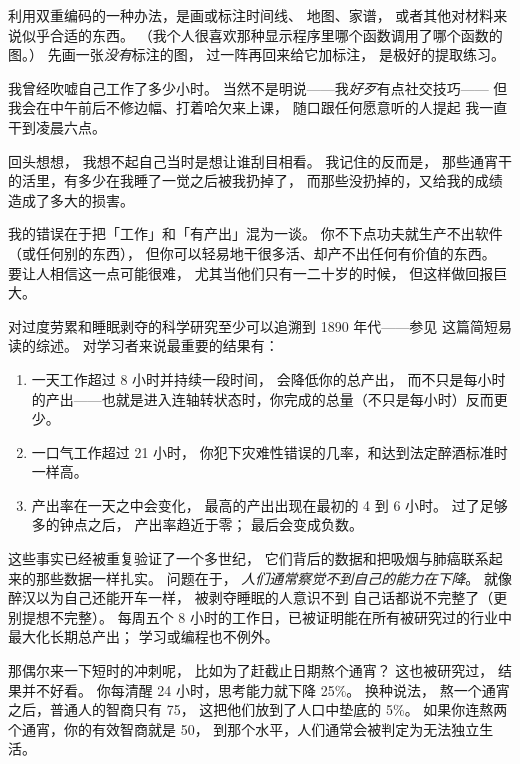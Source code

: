 利用双重编码的一种办法，是画或标注时间线、
地图、家谱，
或者其他对材料来说似乎合适的东西。
（我个人很喜欢那种显示程序里哪个函数调用了哪个函数的图。）
先画一张\emph{没有}标注的图，
过一阵再回来给它加标注，
是极好的提取练习。


我曾经吹嘘自己工作了多少小时。
当然不是明说——我\emph{好歹}有点社交技巧——
但我会在中午前后不修边幅、打着哈欠来上课，
随口跟任何愿意听的人提起
我一直干到凌晨六点。

回头想想，
我想不起自己当时是想让谁刮目相看。
我记住的反而是，
那些通宵干的活里，有多少在我睡了一觉之后被我扔掉了，
而那些没扔掉的，又给我的成绩造成了多大的损害。

我的错误在于把「工作」和「有产出」混为一谈。
你不下点功夫就生产不出软件（或任何别的东西），
但你可以轻易地干很多活、却产不出任何有价值的东西。
要让人相信这一点可能很难，
尤其当他们只有一二十岁的时候，
但这样做回报巨大。

对过度劳累和睡眠剥夺的科学研究至少可以追溯到 1890 年代——参见
\cite{Robi2005}这篇简短易读的综述。
对学习者来说最重要的结果有：

\begin{enumerate}

\item
  一天工作超过 8 小时并持续一段时间，
  会降低你的总产出，
  而不只是每小时的产出——也就是进入连轴转状态时，你完成的总量（不只是每小时）反而更少。

\item
  一口气工作超过 21 小时，
  你犯下灾难性错误的几率，和达到法定醉酒标准时一样高。

\item
  产出率在一天之中会变化，
  最高的产出出现在最初的 4 到 6 小时。
  过了足够多的钟点之后，
  产出率趋近于零；
  最后会变成负数。

\end{enumerate}

这些事实已经被重复验证了一个多世纪，
它们背后的数据和把吸烟与肺癌联系起来的那些数据一样扎实。
问题在于，
\emph{人们通常察觉不到自己的能力在下降}。
就像醉汉以为自己还能开车一样，
被剥夺睡眠的人意识不到
自己话都说不完整了（更别提想不完整）。
每周五个 8 小时的工作日，已被证明能在所有被研究过的行业中
最大化长期总产出；
学习或编程也不例外。

那偶尔来一下短时的冲刺呢，
比如为了赶截止日期熬个通宵？
这也被研究过，
结果并不好看。
你每清醒 24 小时，思考能力就下降 25\%。
换种说法，
熬一个通宵之后，普通人的智商只有 75，
这把他们放到了人口中垫底的 5\%。
如果你连熬两个通宵，你的有效智商就是 50，
到那个水平，人们通常会被判定为无法独立生活。

